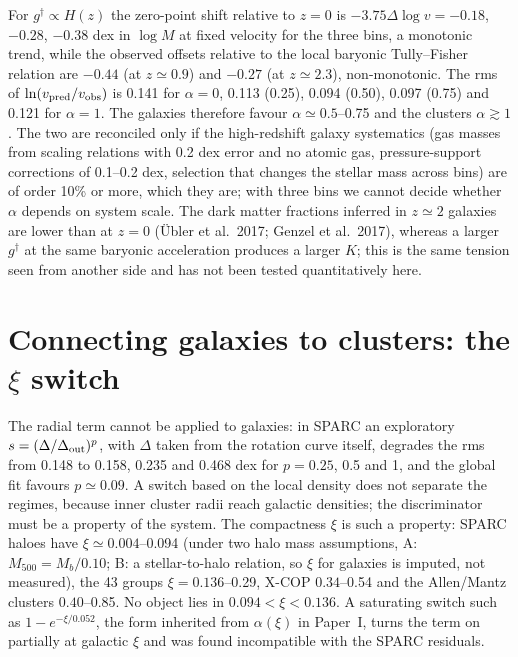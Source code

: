 \documentclass[11pt,a4paper]{article}
\newcommand{\gdag}{g^{\dagger}}
\begin{document}
For $\gdag\propto H(z)$ the zero-point shift relative to $z=0$ is $-3.75\Delta\log v=-0.18$, $-0.28$, $-0.38$ dex in $\log M$ at fixed velocity for the three bins, a monotonic trend, while the observed offsets relative to the local baryonic Tully--Fisher relation are $-0.44$ (at $z\simeq0.9$) and $-0.27$ (at $z\simeq2.3$), non-monotonic. The rms of $\ln(v_{\rm pred}/v_{\rm obs})$ is 0.141 for $\alpha=0$, 0.113 (0.25), 0.094 (0.50), 0.097 (0.75) and 0.121 for $\alpha=1$. The galaxies therefore favour $\alpha\simeq0.5$--0.75 and the clusters $\alpha\gtrsim1$. The two are reconciled only if the high-redshift galaxy systematics (gas masses from scaling relations with 0.2 dex error and no atomic gas, pressure-support corrections of 0.1--0.2 dex, selection that changes the stellar mass across bins) are of order 10\% or more, which they are; with three bins we cannot decide whether $\alpha$ depends on system scale. The dark matter fractions inferred in $z\simeq2$ galaxies are lower than at $z=0$ (\"Ubler et al.\ 2017; Genzel et al.\ 2017), whereas a larger $\gdag$ at the same baryonic acceleration produces a larger $K$; this is the same tension seen from another side and has not been tested quantitatively here.

\section{Connecting galaxies to clusters: the $\xi$ switch}
\label{sec:switch}
The radial term cannot be applied to galaxies: in SPARC an exploratory $s=(\Delta/\Delta_{\rm out})^p$, with $\Delta$ taken from the rotation curve itself, degrades the rms from 0.148 to 0.158, 0.235 and 0.468 dex for $p=0.25$, 0.5 and 1, and the global fit favours $p\simeq0.09$. A switch based on the local density does not separate the regimes, because inner cluster radii reach galactic densities; the discriminator must be a property of the system. The compactness $\xi$ is such a property: SPARC haloes have $\xi\simeq0.004$--0.094 (under two halo mass assumptions, A: $M_{500}=M_b/0.10$; B: a stellar-to-halo relation, so $\xi$ for galaxies is imputed, not measured), the 43 groups $\xi=0.136$--0.29, X-COP $0.34$--0.54 and the Allen/Mantz clusters $0.40$--0.85. No object lies in $0.094<\xi<0.136$. A saturating switch such as $1-e^{-\xi/0.052}$, the form inherited from $\alpha(\xi)$ in Paper~I, turns the term on partially at galactic $\xi$ and was found incompatible with the SPARC residuals.
\end{document}
